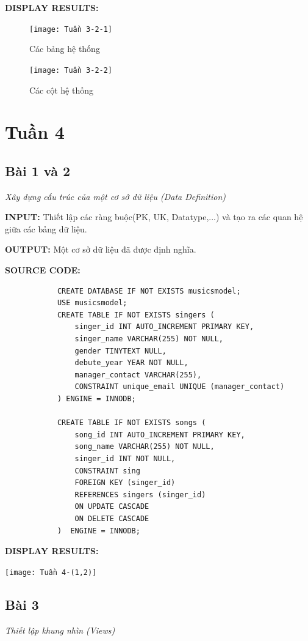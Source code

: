 \documentclass[12pt,a4paper]{report}
\begin{document}
	{\bf DISPLAY RESULTS:}
	\begin{figure}[!h]
		\texttt{[image: Tuần 3-2-1]}\hfill
		\caption{Các bảng hệ thống}
		\vskip 1.5cm
		\texttt{[image: Tuần 3-2-2]}\hfill
		\caption{Các cột hệ thống}
	\end{figure}
\newpage
\section{Tuần 4}
\subsection{Bài 1 và 2}
	\begin{center}
		{\it Xây dựng cấu trúc của một cơ sở dữ liệu (Data Definition)}
	\end{center}
	
	{\bf INPUT:} Thiết lập các ràng buộc(PK, UK, Datatype,...) và tạo ra các quan hệ giữa các bảng dữ liệu.
	
	{\bf OUTPUT:} Một cơ sở dữ liệu đã được định nghĩa.
	
	{\bf SOURCE CODE:}
		\begin{lstlisting}
			CREATE DATABASE IF NOT EXISTS musicsmodel;
			USE musicsmodel;
			CREATE TABLE IF NOT EXISTS singers (
				singer_id INT AUTO_INCREMENT PRIMARY KEY,
    			singer_name VARCHAR(255) NOT NULL,
   				gender TINYTEXT NULL,
    			debute_year YEAR NOT NULL,
    			manager_contact VARCHAR(255),
    			CONSTRAINT unique_email UNIQUE (manager_contact)
			) ENGINE = INNODB;
			
			CREATE TABLE IF NOT EXISTS songs (
				song_id INT AUTO_INCREMENT PRIMARY KEY, 
    			song_name VARCHAR(255) NOT NULL,
				singer_id INT NOT NULL,
    			CONSTRAINT sing
    			FOREIGN KEY (singer_id)
    			REFERENCES singers (singer_id)
				ON UPDATE CASCADE
        		ON DELETE CASCADE
			)  ENGINE = INNODB;
		\end{lstlisting}
	
	{\bf DISPLAY RESULTS:}
		\vskip 1cm
		\begin{center}
			\texttt{[image: Tuần 4-(1,2)]}
		\end{center}

\subsection{Bài 3}
	\begin{center}
		{\it Thiết lập khung nhìn (Views)}
	\end{center}
	
\end{document}
